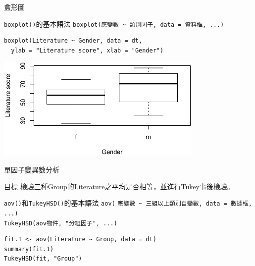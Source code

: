 \documentclass[12pt, aspectratio=43]{beamer}
\begin{document}
\begin{frame}[fragile]{盒形圖}

\begin{block}{\texttt{boxplot()}的基本語法}
\verb+boxplot(應變數 ~ 類別因子, data = 資料框, ...)+
\end{block}

\begin{verbatim}
boxplot(Literature ~ Gender, data = dt, 
  ylab = "Literature score", xlab = "Gender")
\end{verbatim}

\begin{center}
\includegraphics[width=0.75\textwidth]{Rplot-two-group.pdf}
\end{center}
\end{frame}


\begin{frame}[fragile]{單因子變異數分析}
\begin{block}{目標}
檢驗三種Group的Literature之平均是否相等，並進行Tukey事後檢驗。
\end{block}

\begin{block}{\texttt{aov()}和\texttt{TukeyHSD()}的基本語法}
\verb+aov(+
\verb+應變數 ~ 三組以上類別自變數, data = 數據框, ...)+\\
\verb+TukeyHSD(aov物件, "分組因子", ...)+
\end{block}

\begin{verbatim}
fit.1 <- aov(Literature ~ Group, data = dt)
summary(fit.1)
TukeyHSD(fit, "Group")
\end{verbatim}

\end{frame}
\end{document}
